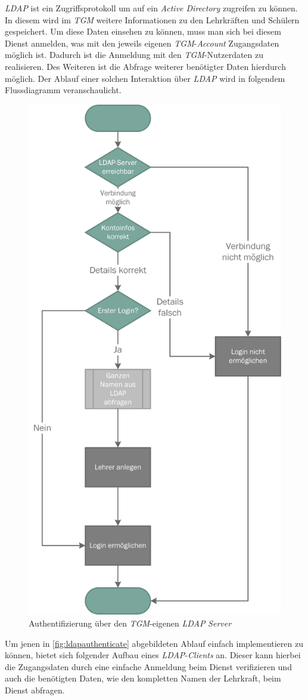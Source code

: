 \textit{LDAP} ist ein Zugriffsprotokoll um auf ein \textit{Active Directory} zugreifen zu können. In diesem wird im \textit{TGM} weitere Informationen zu den Lehrkräften und Schülern gespeichert. Um diese Daten einsehen zu können, muss man sich bei diesem Dienst anmelden, was mit den jeweils eigenen \textit{TGM}-\textit{Account} Zugangsdaten möglich ist. Dadurch ist die Anmeldung mit den \textit{TGM}-Nutzerdaten zu realisieren. Des Weiteren ist die Abfrage weiterer benötigter Daten hierdurch möglich. Der Ablauf einer solchen Interaktion über \textit{LDAP} wird in folgendem Flussdiagramm veranschaulicht.

\begin{figure}[H]
	\centering
	\includegraphics[width=0.5\linewidth]{images/mbeier_konzept/LDAP_Authenticate}
	\caption[Authentifizierung über \textit{LDAP}]{Authentifizierung über den \textit{TGM}-eigenen \textit{LDAP} \textit{Server}}
	\label{fig:ldapauthenticate}
\end{figure}

\newpage

Um jenen in \autoref{fig:ldapauthenticate} abgebildeten Ablauf einfach implementieren zu können, bietet sich folgender Aufbau eines \textit{LDAP}-\textit{Clients} an. Dieser kann hierbei die Zugangsdaten durch eine einfache Anmeldung beim Dienst verifizieren und auch die benötigten Daten, wie den kompletten Namen der Lehrkraft, beim Dienst abfragen.

